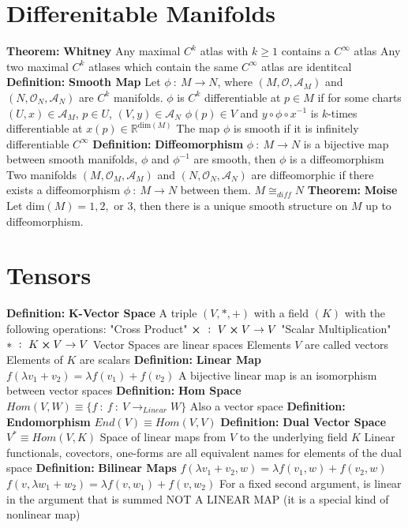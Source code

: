 \documentclass[14pt]{extarticle}
\def\Definition{{\color{blue} \textbf{Definition:} }}
\def\Theorem{{\color{red} \textbf{Theorem:} }}
\begin{document}
\begin{outline}
	\section*{Differenitable Manifolds}
		\1	\Theorem \textbf{Whitney}
			\2	Any maximal $C^k$ atlas with $k \ge 1$ contains a $C^{\infty}$
					atlas
			\2	Any two maximal $C^k$ atlases which contain the same $C^{\infty}$
					atlas are identitcal
		\1	\Definition \textbf{Smooth Map}
			\2	Let $\phi~:~M \rightarrow N$, where $(M,\mathcal{O},\mathscr{A}_M)$
					and $(N,\mathcal{O}_N,\mathscr{A}_N)$ are $C^k$ manifolds.
					$\phi$ is $C^k$ differentiable at $p \in M$ if for some charts
					$(U,x) \in \mathscr{A}_M$, $p \in U$, $(V,y) \in \mathscr{A}_N$
					$\phi(p) \in V$ and $y \circ \phi \circ x^{-1}$ is $k$-times differentiable
					at $x(p) \in \mathbb{R}^{\text{dim}(M)}$
			\2	The map $\phi$ is smooth if it is infinitely differentiable $C^{\infty}$
		\1	\Definition \textbf{Diffeomorphism}
			\2	$\phi~:~M \rightarrow N$ is a bijective map between smooth manifolds,
					$\phi$ and $\phi^{-1}$ are smooth, then $\phi$ is a diffeomorphism
			\2	Two manifolds $(M,\mathcal{O}_M,\mathscr{A}_M)$ and 
					$(N,\mathcal{O}_N,\mathscr{A}_N)$ are diffeomorphic if there exists
					a diffeomorphism $\phi~:~M \rightarrow N$ between them.
			\2	$M \cong_{diff} N$
		\1	\Theorem \textbf{Moise}
			\2	Let $\text{dim}(M) = 1,2,\text{ or } 3$, then there is a unique
					smooth structure on $M$ up to diffeomorphism.
	
	\section*{Tensors}
		\1	\Definition \textbf{K-Vector Space}
			\2	A triple $(V,*,+)$ with a field $(K)$ with the following operations:
				\3	"Cross Product" $\cross~:~V \cross V \rightarrow V$
				\3	"Scalar Multiplication" $*~:~K \cross V \rightarrow V$
			\2	Vector Spaces are linear spaces
				\3	Elements $V$ are called vectors
				\3	Elements of $K$ are scalars
			\2	\Definition \textbf{Linear Map}
				\3	$f(\lambda v_1 + v_2) = \lambda f(v_1) + f(v_2)$
				\3	A bijective linear map is an isomorphism between vector spaces
		\1	\Definition \textbf{Hom Space}
			\2	$Hom(V,W) \equiv \{f~:~f~:~V \rightarrow_{Linear} W\}$
				\3	Also a vector space
			\2	\Definition \textbf{Endomorphism}
				\3	$End(V) \equiv Hom(V,V)$
		\1	\Definition \textbf{Dual Vector Space}
			\2	$V^* \equiv Hom(V,K)$
				\3	Space of linear maps from $V$ to the underlying field $K$
				\3	Linear functionals, covectors, one-forms are all equivalent names
						for elements of the dual space
		\1	\Definition \textbf{Bilinear Maps}
			\2	$f(\lambda v_1 + v_2,w) = \lambda f(v_1,w) + f(v_2,w)$
			\2	$f(v,\lambda w_1 + w_2) = \lambda f(v,w_1) + f(v,w_2)$
			\2	For a fixed second argument, is linear in the argument that is summed
			\2	NOT A LINEAR MAP (it is a special kind of nonlinear map)


\end{outline}
\end{document}
